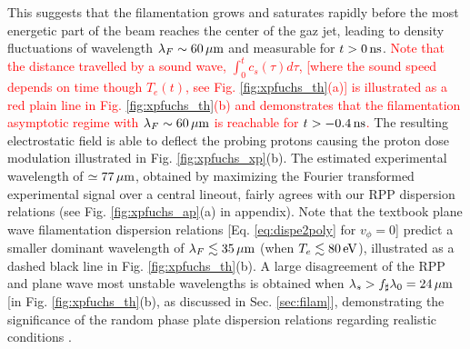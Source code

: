 \documentclass[
 reprint,
 superscriptaddress,
 amsmath,amssymb,
 aps,
]{revtex4-1}
\def\tc{\textcolor{red}}
\begin{document}
This suggests that the filamentation grows and saturates rapidly before the most energetic part of the beam reaches the center of the gaz jet, leading to  density fluctuations of wavelength   $\lambda_F \sim 60 \,\rm\mu m$ and measurable for $t>0\,\rm ns$.
\tc{ 
Note that the distance travelled by a sound wave,  $\int_0^t c_s(\tau)d\tau$, 
 [where the sound speed depends on time though $T_e(t)$, see Fig. \ref{fig:xpfuchs_th}(a)] is illustrated as a red plain line in Fig. \ref{fig:xpfuchs_th}(b) and demonstrates that the filamentation asymptotic regime with  $\lambda_F \sim 60 \,\rm\mu m$ is reachable for $t>-0.4 \,\rm ns$. 
 }
The resulting electrostatic field is able to deflect the probing protons   causing the proton dose modulation illustrated in Fig. \ref{fig:xpfuchs_xp}(b). 
The estimated experimental wavelength of $\simeq 77 \,\rm\mu m$, obtained by maximizing the Fourier transformed experimental signal over a central lineout, fairly agrees with our RPP dispersion relations (see Fig. \ref{fig:xpfuchs_ap}(a)  in appendix). 
Note that the textbook plane wave filamentation dispersion relations [Eq. \eqref{eq:dispe2poly} for $v_\phi=0$] predict a  smaller dominant wavelength of $ \lambda_F\lesssim  35\, \rm\mu m$ (when $T_e\lesssim80\, \rm eV$), illustrated as a dashed black line in Fig. \ref{fig:xpfuchs_th}(b). A large disagreement of the  RPP and plane wave most unstable wavelengths is obtained when  $\lambda_s> f_\sharp\lambda_0=24\,\rm\mu m$ [in Fig. \ref{fig:xpfuchs_th}(b), as discussed in Sec. \ref{sec:filam}], demonstrating the significance of the random phase plate dispersion relations regarding realistic conditions \cite[]{Berger_98}.
\end{document}
